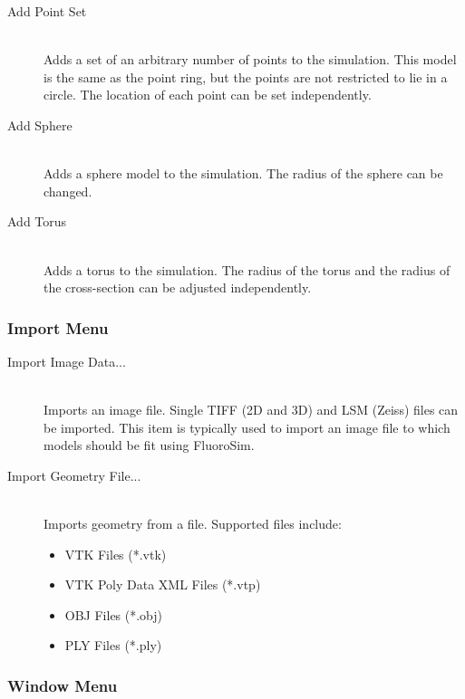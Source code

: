 \documentclass[11pt,titlepage,twoside]{article}
\begin{document}
\begin{description}
  \item[Add Point Set] \hfill \\
  Adds a set of an arbitrary number of points to the simulation. This model is the same as the point ring, but the points are not restricted to lie in a circle. The location of each point can be set independently.
  
  \item[Add Sphere] \hfill \\
  Adds a sphere model to the simulation. The radius of the sphere can be changed.

  \item[Add Torus] \hfill \\
  Adds a torus to the simulation. The radius of the torus and the radius of the cross-section can be adjusted independently.

\end{description}

\subsubsection{Import Menu}

\begin{description}

  \item[Import Image Data...] \hfill \\
  Imports an image file. Single TIFF (2D and 3D) and LSM (Zeiss) files can be imported. This item is typically used to import an image file to which models should be fit using FluoroSim.
  
  \item[Import Geometry File...] \hfill \\
  Imports geometry from a file. Supported files include:
  
  \begin{itemize}
  \item VTK Files (*.vtk)
  \item VTK Poly Data XML Files (*.vtp)
  \item OBJ Files (*.obj)
  \item PLY Files (*.ply)
  \end{itemize}

\end{description}

\subsubsection{Window Menu}
\end{document}
